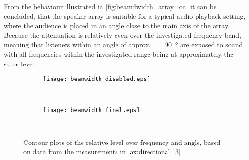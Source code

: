 From the behaviour illustrated in \autoref{fig:beamdwidth_array_on} it can be concluded, that the speaker array is suitable for a typical audio playback setting, where the audience is placed in an angle close to the main axis of the array. Because the attenuation is relatively even over the investigated frequency band, meaning that listeners within an angle of approx. \SI{\pm 90}{\degree} are exposed to sound with all frequencies within the investigated range being at approximately the same level.

\begin{figure}[h]
	\centering
	\begin{subfigure}[c]{\textwidth}
		\texttt{[image: beamwidth\_disabled.eps]}
		\label{fig:beamdwidth_array_off}
	\end{subfigure}\\
		\begin{subfigure}[c]{\textwidth}
		\texttt{[image: beamwidth\_final.eps]}
		\label{fig:beamdwidth_array_on}
	\end{subfigure}\\
	\caption{Contour plots of the relative level over frequency and angle, based on data from the measurements in \autoref{ax:directional_3}}
	\label{fig:beamwidth_array}
\end{figure}